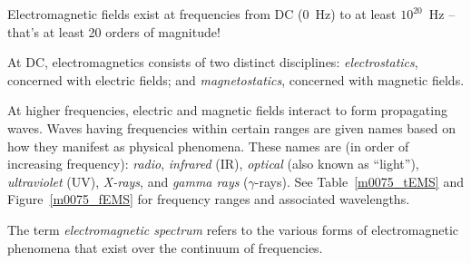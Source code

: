 

\label{m0075_Electromagnetic_Spectrum} %

Electromagnetic fields exist at frequencies from DC (0~Hz) to at least $10^{20}$~Hz -- that's at least 20 orders of magnitude!

At DC, electromagnetics consists of two distinct disciplines: \emph{electrostatics}, concerned with electric fields; and \emph{magnetostatics}, concerned with magnetic fields.

At higher frequencies, electric and magnetic fields interact to form propagating waves.
Waves having frequencies within certain ranges are given names based on how they manifest as physical phenomena. 
These names are (in order of increasing frequency):
\emph{radio},
\emph{infrared} (IR),
\emph{optical} (also known as ``light''),
\emph{ultraviolet} (UV),
\emph{X-rays}, and
\emph{gamma rays} ($\gamma$-rays).
See Table~\ref{m0075_tEMS} and Figure~\ref{m0075_fEMS} for frequency ranges and associated wavelengths.

\begin{mdframed}[backgroundcolor=yellow!20,nobreak=true] 
The term \emph{electromagnetic spectrum} 
refers to the various forms of electromagnetic phenomena that exist over the continuum of frequencies.
\end{mdframed}

